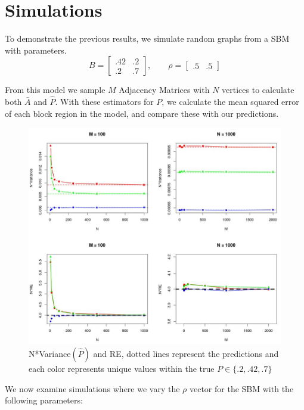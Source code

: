 	\section{Simulations}
	To demonstrate the previous results, we simulate random graphs from a SBM with parameters.
	\begin{equation*}
	B = \begin{bmatrix}
	.42 & .2 \\
	.2 & .7 
	\end{bmatrix}
	,\qquad \rho = \begin{bmatrix}
	.5 & .5
	\end{bmatrix}
	\end{equation*}
	
	From this model we sample $M$ Adjacency Matrices with $N$ vertices to calculate both $\bar{A}$ and $\hat{P}$.  With these estimators for $P$, we calculate the mean squared error of each block region in the model, and compare these with our predictions.
	
	\begin{figure}[!htb]
		\centering
		\includegraphics[width=16cm]{Var_RE.JPG}
		\caption{N*Variance$(\hat{P})$ and RE, dotted lines represent the predictions and each color represents unique values within the true $P \in \{.2,.42,.7\}$ }
		\label{fig:plot1}
	\end{figure}
	\newpage
	We now examine simulations where we vary the $\rho$ vector for the SBM with the following parameters:
	
